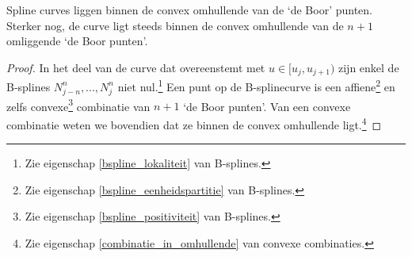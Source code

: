 \documentclass[computergesteund_ontwerp_van_curven_en_oppervlakken.tex]{subfiles}
\begin{document}
\begin{ei}
Spline curves liggen binnen de convex omhullende van de `de Boor' punten. Sterker nog, de curve ligt steeds binnen de convex omhullende van de $n+1$ omliggende `de Boor punten'.

\begin{proof}
In het deel van de curve dat overeenstemt met $u \in [u_j,u_{j+1})$ zijn enkel de B-splines $N_{j-n}^{n},..., N_{j}^{n}$ niet nul.\footnote{Zie eigenschap \ref{bspline_lokaliteit} van B-splines.} Een punt op de B-splinecurve is een affiene\footnote{Zie eigenschap \ref{bspline_eenheidspartitie} van B-splines.} en zelfs convexe\footnote{Zie eigenschap \ref{bspline_positiviteit} van B-splines.} combinatie van $n+1$ `de Boor punten'. Van een convexe combinatie weten we bovendien dat ze binnen de convex omhullende ligt.\footnote{Zie eigenschap \ref{combinatie_in_omhullende} van convexe combinaties.}
\end{proof}
\end{ei}
\end{document}
